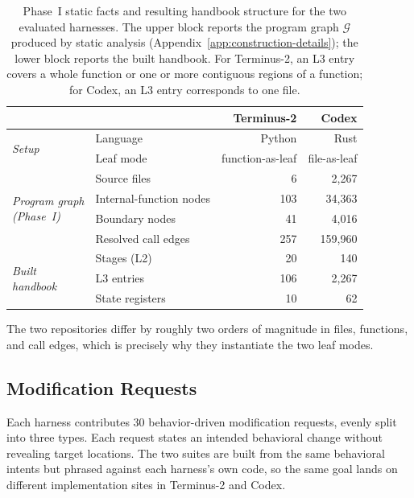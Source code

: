 \documentclass[]{ailab}
\newcommand{\hbsmall}{\textsf{function-as-leaf}}
\newcommand{\hblarge}{\textsf{file-as-leaf}}
\begin{document}
\begin{table}[h]
\centering
\small
\caption{Phase~I static facts and resulting handbook structure for the two
evaluated harnesses. The upper block reports the program graph $\mathcal{G}$
produced by static analysis (Appendix~\ref{app:construction-details}); the lower
block reports the built handbook. For Terminus-2, an L3 entry covers a whole
function or one or more contiguous regions of a function; for Codex, an L3 entry
corresponds to one file.}
\label{tab:handbook-stats}
\setlength{\tabcolsep}{10pt}
\begin{tabular}{@{}l l r r@{}}
\toprule
& & \textbf{Terminus-2} & \textbf{Codex} \\
\midrule
\multirow{2}{*}{\emph{Setup}}
  & Language  & Python     & Rust \\
  & Leaf mode & \hbsmall{} & \hblarge{} \\
\midrule
\multirow{4}{*}{\parbox[c]{2.3cm}{\emph{Program graph\\(Phase~I)}}}
  & Source files            & 6   & 2{,}267 \\
  & Internal-function nodes & 103 & 34{,}363 \\
  & Boundary nodes          & 41  & 4{,}016 \\
  & Resolved call edges     & 257 & 159{,}960 \\
\midrule
\multirow{3}{*}{\parbox[c]{2.3cm}{\emph{Built\\handbook}}}
  & Stages (L2)     & 20  & 140 \\
  & L3 entries      & 106 & 2{,}267 \\
  & State registers & 10  & 62 \\
\bottomrule
\end{tabular}
\end{table}

The two repositories differ by roughly two orders of magnitude in files,
functions, and call edges, which is precisely why they instantiate the two leaf
modes.

\subsection{Modification Requests}

Each harness contributes 30 behavior-driven modification requests, evenly split
into three types. Each request states an intended behavioral change without
revealing target locations. The two suites are built from the same behavioral
intents but phrased against each harness's own code, so the same goal lands on
different implementation sites in Terminus-2 and Codex.
\end{document}
